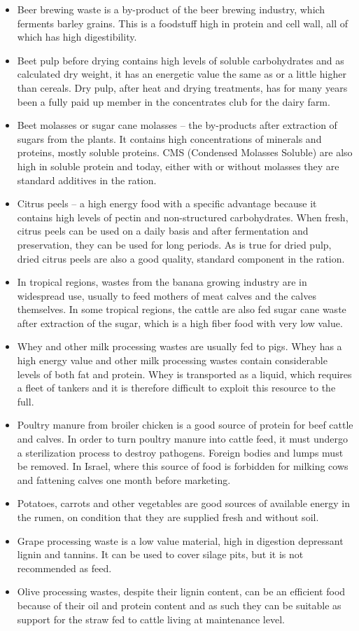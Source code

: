 \documentclass[]{book}
\begin{document}
\begin{itemize}
\item
  Beer brewing waste is a by-product of the beer brewing industry, which ferments barley grains. This is a foodstuff high in protein and cell wall, all of which has high digestibility.
\item
  Beet pulp before drying contains high levels of soluble carbohydrates and as calculated dry weight, it has an energetic value the same as or a little higher than cereals. Dry pulp, after heat and drying treatments, has for many years been a fully paid up member in the concentrates club for the dairy farm.
\item
  Beet molasses or sugar cane molasses -- the by-products after extraction of sugars from the plants. It contains high concentrations of minerals and proteins, mostly soluble proteins. CMS (Condensed Molasses Soluble) are also high in soluble protein and today, either with or without molasses they are standard additives in the ration.
\item
  Citrus peels -- a high energy food with a specific advantage because it contains high levels of pectin and non-structured carbohydrates. When fresh, citrus peels can be used on a daily basis and after fermentation and preservation, they can be used for long periods. As is true for dried pulp, dried citrus peels are also a good quality, standard component in the ration.
\item
  In tropical regions, wastes from the banana growing industry are in widespread use, usually to feed mothers of meat calves and the calves themselves. In some tropical regions, the cattle are also fed sugar cane waste after extraction of the sugar, which is a high fiber food with very low value.
\item
  Whey and other milk processing wastes are usually fed to pigs. Whey has a high energy value and other milk processing wastes contain considerable levels of both fat and protein. Whey is transported as a liquid, which requires a fleet of tankers and it is therefore difficult to exploit this resource to the full.
\item
  Poultry manure from broiler chicken is a good source of protein for beef cattle and calves. In order to turn poultry manure into cattle feed, it must undergo a sterilization process to destroy pathogens. Foreign bodies and lumps must be removed. In Israel, where this source of food is forbidden for milking cows and fattening calves one month before marketing.
\item
  Potatoes, carrots and other vegetables are good sources of available energy in the rumen, on condition that they are supplied fresh and without soil.
\item
  Grape processing waste is a low value material, high in digestion depressant lignin and tannins. It can be used to cover silage pits, but it is not recommended as feed.
\item
  Olive processing wastes, despite their lignin content, can be an efficient food because of their oil and protein content and as such they can be suitable as support for the straw fed to cattle living at maintenance level.
\end{itemize}
\end{document}

